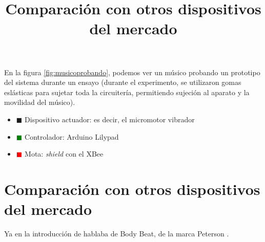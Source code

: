 En la figura \ref{fig:musicoprobando}, podemos ver un músico probando un prototipo
del sistema durante un ensayo (durante el experimento, se utilizaron gomas eslásticas para sujetar toda
la circuitería, permitiendo sujeción al aparato y la movilidad del músico).
\begin{itemize}
  \item \textcolor{blueS}{$\blacksquare$} Dispositivo actuador: es decir,
  el micromotor vibrador
  \item \textcolor{green}{$\blacksquare$} Controlador: Arduino Lilypad
  \item \textcolor{red}{$\blacksquare$} Mota: \textit{shield} con el XBee
\end{itemize}






\section{Comparación con otros dispositivos del mercado}
\title{Comparación con otros dispositivos del mercado}
Ya en la introducción de hablaba de Body Beat, de la marca Peterson \cite{bodybeat}.\\

